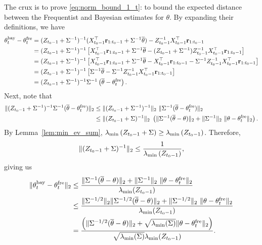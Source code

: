 The crux is to prove \eqref{eq:norm_bound_1_t}: to bound the expected distance between the Frequentist and Bayesian estimates for $\theta$. By expanding
  their definitions, we have
  \begin{align*}
    \theta_t^{\textrm{bay}} - \theta_{t}^{\textrm{fre}}
    &= (Z_{t_0-1} + \Sigma^{-1})^{-1} (X_{t_0-1}^{\top} \mathbf{r}_{1:t_0-1} + \Sigma^{-1}
    \overline \theta) - Z_{t_0-1}^{-1} X_{t_0-1}^{\top} \mathbf{r}_{1:t_0-1} \\
    &= (Z_{t_0-1} + \Sigma^{-1})^{-1} \left[X_{t_0-1}^{\top} \mathbf{r}_{1:t_0-1} + \Sigma^{-1} \overline \theta -
    (Z_{t_0-1} + \Sigma^{-1})Z_{t_0-1}^{-1} X_{t_0-1}^{\top} \mathbf{r}_{1:t_0-1}\right] \\
    &= (Z_{t_0-1} + \Sigma^{-1})^{-1} \left[X_{t_0-1}^{\top} \mathbf{r}_{1:t_0-1} + \Sigma^{-1} \overline \theta -
    X_{t_0-1}^{\top} \mathbf{r}_{1:t_0-1}  - \Sigma^{-1}Z_{t_0-1}^{-1} X_{t_0-1}^{\top} \mathbf{r}_{1:t_0-1}\right] \\
    &= (Z_{t_0-1} + \Sigma^{-1})^{-1} \left[\Sigma^{-1} \overline \theta -
    \Sigma^{-1}Z_{t_0-1}^{-1} X_{t_0-1}^{\top} \mathbf{r}_{1:t_0-1}\right] \\
    &= (Z_{t_0-1} + \Sigma^{-1})^{-1} \Sigma^{-1} \left(\overline \theta - \theta_{t}^{\textrm{fre}}\right).
  \end{align*}
  Next, note that
  \begin{align*}
    \|(Z_{t_0-1} + \Sigma^{-1})^{-1} \Sigma^{-1} (\overline \theta - \theta_{t}^{\textrm{fre}})\|_2
    &\le \|(Z_{t_0-1} + \Sigma^{-1})^{-1}\|_2 ~ \|\Sigma^{-1} (\overline \theta - \theta_{t}^{\textrm{fre}})\|_2 \\
    &\le \|(Z_{t_0-1} + \Sigma)^{-1}\|_2 ~ \left(\|\Sigma^{-1}(\overline \theta - \theta)\|_2
    + \|\Sigma^{-1}\|_2 ~ \|\theta - \theta_{t}^{\textrm{fre}}\|_2\right).
  \end{align*}
  By Lemma~\ref{lem:min_ev_sum}, $\lambda_{\min}\left(Z_{t_0-1} + \Sigma\right) \ge
  \lambda_{\min}\left(Z_{t_0-1}\right)$. Therefore,
  \[
    \|(Z_{t_0-1} + \Sigma)^{-1}\|_2 \le \frac{1}{\lambda_{\min}\left(Z_{t_0-1}\right)},
  \]
  giving us
  \begin{align*}
    \|\theta_t^{\textrm{bay}} - \theta_{t}^{\textrm{fre}}\|_2
    &\le \frac{\|\Sigma^{-1}(\overline \theta - \theta)\|_2 + \|\Sigma^{-1}\|_2
    ~ \|\theta - \theta_{t}^{\textrm{fre}}\|_2}{\lambda_{\min}(Z_{t_0-1})} \\
    &\le \frac{\|\Sigma^{-1/2}\|_2 \|\Sigma^{-1/2}(\overline \theta - \theta)\|_2 + \|\Sigma^{-1/2}\|_2
    ~ \|\theta - \theta_{t}^{\textrm{fre}}\|_2}{\lambda_{\min}(Z_{t_0-1})} \\
    &= \frac{\left(\|\Sigma^{-1/2}(\overline \theta - \theta)\|_2 + \sqrt{\lambda_{\min}(\Sigma)}
    \|\theta - \theta_{t}^{\textrm{fre}}\|_2\right)}{\sqrt{\lambda_{\min}(\Sigma)} \lambda_{\min}(Z_{t_0-1})}.
  \end{align*}

